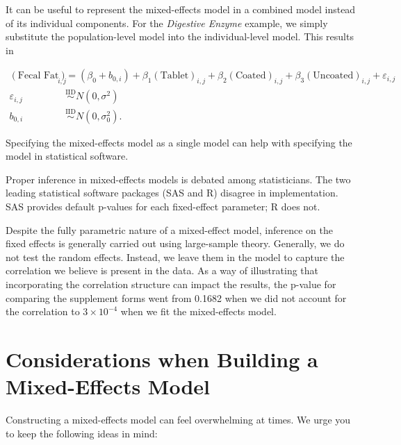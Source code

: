 \documentclass[
]{book}
\theoremstyle{plain}
\theoremstyle{mydefn}
\theoremstyle{myexmpl}
\theoremstyle{remark}
\begin{document}
It can be useful to represent the mixed-effects model in a combined model instead of its individual components. For the \emph{Digestive Enzyme} example, we simply substitute the population-level model into the individual-level model. This results in

\[
\begin{aligned}
  (\text{Fecal Fat})_{i,j} 
    &= \left(\beta_0 + b_{0,i}\right) + \beta_1 (\text{Tablet})_{i,j} + \beta_2 (\text{Coated})_{i,j} + \beta_3 (\text{Uncoated})_{i,j} + \varepsilon_{i,j} \\
  \varepsilon_{i,j} &\stackrel{\text{IID}}{\sim}N\left(0, \sigma^2\right) \\
  b_{0,i} &\stackrel{\text{IID}}{\sim}N\left(0, \sigma^2_0\right).
\end{aligned}
\]

\begin{rmdtip}
Specifying the mixed-effects model as a single model can help with specifying the model in statistical software.
\end{rmdtip}

\begin{rmdwarning}
Proper inference in mixed-effects models is debated among statisticians. The two leading statistical software packages (SAS and R) disagree in implementation. SAS provides default p-values for each fixed-effect parameter; R does not.
\end{rmdwarning}

Despite the fully parametric nature of a mixed-effect model, inference on the fixed effects is generally carried out using large-sample theory. Generally, we do not test the random effects. Instead, we leave them in the model to capture the correlation we believe is present in the data. As a way of illustrating that incorporating the correlation structure can impact the results, the p-value for comparing the supplement forms went from 0.1682 when we did not account for the correlation to \ensuremath{3\times 10^{-4}} when we fit the mixed-effects model.

\hypertarget{considerations-when-building-a-mixed-effects-model}{%
\section{Considerations when Building a Mixed-Effects Model}\label{considerations-when-building-a-mixed-effects-model}}

Constructing a mixed-effects model can feel overwhelming at times. We urge you to keep the following ideas in mind:
\end{document}
